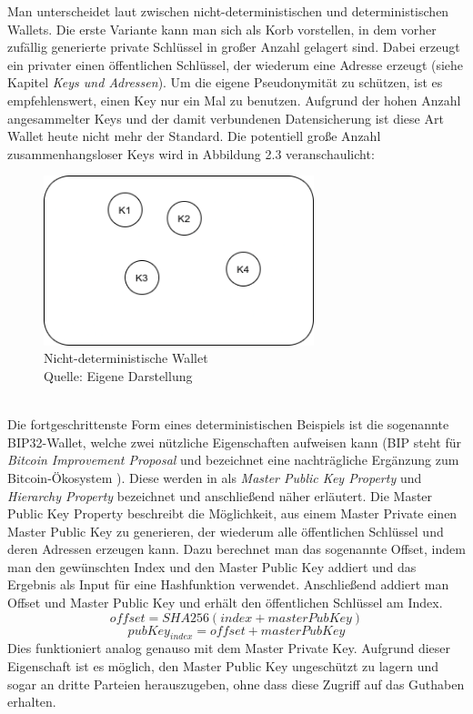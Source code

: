Man unterscheidet laut \cite{antanopoulos_2014} zwischen nicht-deterministischen und deterministischen Wallets. Die erste Variante kann man sich als Korb vorstellen, in dem vorher zufällig generierte private Schlüssel in großer Anzahl gelagert sind. Dabei erzeugt ein privater einen öffentlichen Schlüssel, der wiederum eine Adresse erzeugt (siehe Kapitel \emph{Keys und Adressen}).
Um die eigene Pseudonymität zu schützen, ist es empfehlenswert, einen Key nur ein Mal zu benutzen. Aufgrund der hohen Anzahl angesammelter Keys und der damit verbundenen Datensicherung ist diese Art Wallet heute nicht mehr der Standard. Die potentiell große Anzahl zusammenhangsloser Keys wird in Abbildung 2.3 veranschaulicht:
\begin{figure}[htpb]
	\centering
	\includegraphics[width=0.7\textwidth]{images/non_det_wallet.png}
	\caption{Nicht-deterministische Wallet\\
	Quelle: Eigene Darstellung}
	\label{6braun:fig:non-deterministic_wallet}
\end{figure}\\
Die fortgeschrittenste Form eines deterministischen Beispiels ist die sogenannte BIP32-Wallet, welche zwei nützliche Eigenschaften aufweisen kann (BIP steht für \emph{Bitcoin Improvement Proposal} und bezeichnet eine nachträgliche Ergänzung zum Bitcoin-Ökosystem \cite{antanopoulos_2014}).
Diese werden in \cite{buterin_2013} als \emph{Master Public Key Property} und \emph{Hierarchy Property} bezeichnet und anschließend näher erläutert.
Die Master Public Key Property beschreibt die Möglichkeit, aus einem Master Private einen Master Public Key zu generieren, der wiederum alle öffentlichen Schlüssel und deren Adressen erzeugen kann. Dazu berechnet man das sogenannte Offset, indem man den gewünschten Index und den Master Public Key addiert und das Ergebnis als Input für eine Hashfunktion verwendet. Anschließend addiert man Offset und Master Public Key und erhält den öffentlichen Schlüssel am Index.
$$offset = SHA256(index + masterPubKey)$$
$$pubKey_{index} = offset + masterPubKey$$ Dies funktioniert analog genauso mit dem Master Private Key. 
Aufgrund dieser Eigenschaft ist es möglich, den Master Public Key ungeschützt zu lagern und sogar an dritte Parteien herauszugeben, ohne dass diese Zugriff auf das Guthaben erhalten.\\

